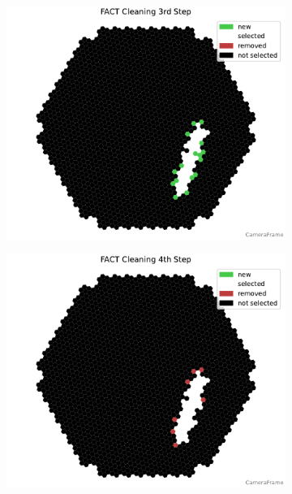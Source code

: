 \begin{figure}
\begin{subfigure}[t]{0.32\textwidth}
        \includegraphics[width=\textwidth]{plots/cleaner_steps/fact_3.pdf}
    \end{subfigure}
    \begin{subfigure}[b]{0.32\textwidth}
        \includegraphics[width=\textwidth]{plots/cleaner_steps/fact_4.pdf}
    \end{subfigure}
    \hfill
    \begin{subfigure}[b]{0.32\textwidth}

\end{subfigure}
\end{figure}
